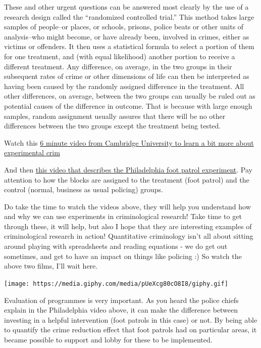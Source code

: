 \documentclass[]{book}
\theoremstyle{definition}
\theoremstyle{definition}
\theoremstyle{definition}
\theoremstyle{remark}
\begin{document}
These and other urgent questions can be answered most clearly by the use
of a research design called the ``randomized controlled trial.'' This
method takes large samples of people--or places, or schools, prisons,
police beats or other units of analysis--who might become, or have
already been, involved in crimes, either as victims or offenders. It
then uses a statistical formula to select a portion of them for one
treatment, and (with equal likelihood) another portion to receive a
different treatment. Any difference, on average, in the two groups in
their subsequent rates of crime or other dimensions of life can then be
interpreted as having been caused by the randomly assigned difference in
the treatment. All other differences, on average, between the two groups
can usually be ruled out as potential causes of the difference in
outcome. That is because with large enough samples, random assignment
usually assures that there will be no other differences between the two
groups except the treatment being tested.

Watch this
\href{https://www.youtube.com/watch?v=IGDF1-B1Yjs\&feature=player_embedded}{6
minute video from Cambridge University to learn a bit more about
experimental crim}

And then
\href{http://www.cla.temple.edu/cj/center-for-security-and-crime-science/the-philadelphia-foot-patrol-experiment/}{this
video that describes the Philadelphia foot patrol experiment}. Pay
attention to how the blocks are assigned to the treatment (foot patrol)
and the control (normal, business as usual policing) groups.

Do take the time to watch the videos above, they will help you
understand how and why we can use experiments in criminological
research! Take time to get through these, it will help, but also I hope
that they are interesting examples of criminological research in action!
Quantitative criminology isn't all about sitting around playing with
spreadsheets and reading equations - we do get out sometimes, and get to
have an impact on things like policing :) So watch the above two films,
I'll wait here.

\texttt{[image: https://media.giphy.com/media/pUeXcg80cO8I8/giphy.gif]}

Evaluation of programmes is very important. As you heard the police
chiefs explain in the Philadelphia video above, it can make the
difference between investing in a helpful intervention (foot patrols in
this case) or not. By being able to quantify the crime reduction effect
that foot patrols had on particular areas, it became possible to support
and lobby for these to be implemented.
\end{document}
